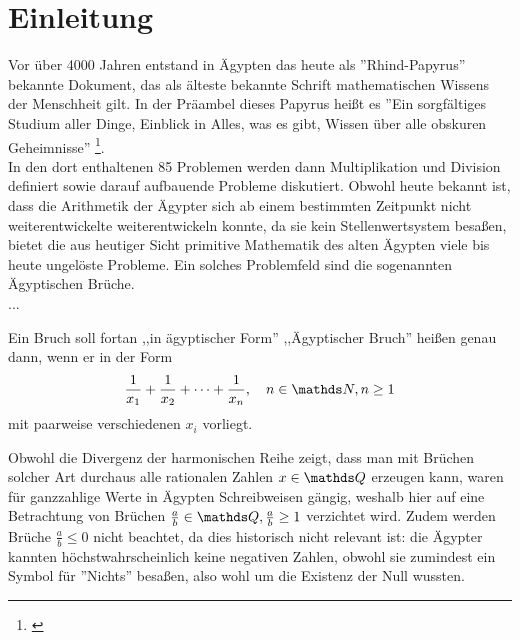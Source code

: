 \section{Einleitung}\label{sec:arithmetic}
Vor über 4000 Jahren entstand in Ägypten das heute als ''Rhind-Papyrus'' bekannte Dokument, das als älteste bekannte Schrift mathematischen Wissens der Menschheit gilt. In der Präambel dieses Papyrus heißt es ''Ein sorgfältiges Studium aller Dinge, Einblick in Alles, was es gibt, Wissen über alle obskuren Geheimnisse'' \footnote{\cite[S. 37, Übersetzung durch den Autor]{Burton2011}}.\\ In den dort enthaltenen 85 Problemen werden dann Multiplikation und Division definiert sowie darauf aufbauende Probleme diskutiert. Obwohl heute bekannt ist, dass die Arithmetik der Ägypter sich ab einem bestimmten Zeitpunkt nicht weiterentwickelte \bzw weiterentwickeln konnte, da sie  kein Stellenwertsystem besaßen, bietet die aus heutiger Sicht primitive Mathematik des alten Ägypten viele bis heute ungelöste Probleme. Ein solches Problemfeld sind die sogenannten Ägyptischen Brüche.
\\...

\begin{def1}\label{def:egypfrac}
	Ein Bruch soll fortan ,,in ägyptischer Form'' \bzw  ,,Ägyptischer Bruch'' heißen genau dann, wenn er in der Form
	$$\uf{x_1} + \uf{x_2} + \cdots + \uf{x_n}, \quad n \in \N, n \ge 1$$
	mit paarweise verschiedenen $x_i$ vorliegt.
\end{def1}

Obwohl die Divergenz der harmonischen Reihe zeigt, dass man mit Brüchen solcher Art durchaus alle rationalen Zahlen $x \in \Q$ erzeugen kann, waren für ganzzahlige Werte in Ägypten Schreibweisen gängig, weshalb hier auf eine Betrachtung von Brüchen $\frac{a}{b}\in \Q, \frac{a}{b} \geq 1$ verzichtet wird. Zudem werden Brüche $\frac{a}{b} \leq 0$ nicht beachtet, da dies historisch nicht relevant ist: die Ägypter kannten höchstwahrscheinlich keine negativen Zahlen, obwohl sie zumindest ein Symbol für ''Nichts'' besaßen, also wohl um die Existenz der Null wussten.